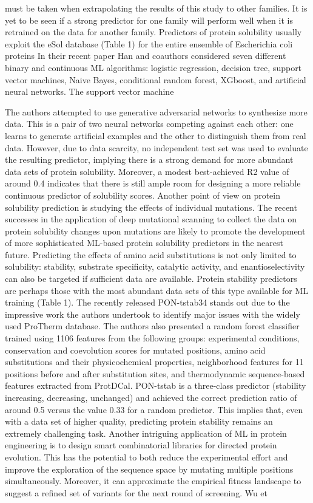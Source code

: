 \documentclass[12pt]{article}
\begin{document}
must be taken when extrapolating the results of this study to other families. It is yet to be seen if a strong predictor for one family will perform well when it is retrained on the data for another family. Predictors of protein solubility usually exploit the eSol database (Table 1) for the entire ensemble of Escherichia coli proteins \cite{67} In their recent paper \cite{35} Han and coauthors considered seven diﬀerent binary and continuous ML algorithms: logistic regression, decision tree, support vector
machines, Naive Bayes, conditional random forest, XGboost, and artiﬁcial neural networks. The support vector machine

The authors attempted to use generative adversarial networks to synthesize more data. This is a pair of two neural networks competing against each other: one learns to generate artiﬁcial examples and the other to distinguish them from real data. However, due to data scarcity, no independent test set was used to evaluate the resulting predictor, implying there is a strong demand for more abundant data sets of protein solubility. Moreover, a modest best-achieved R2 value of around 0.4 indicates that there is still ample room for designing a more reliable continuous predictor of solubility scores. Another point of view on protein solubility prediction is studying the eﬀects of individual mutations. The recent successes in the application of deep mutational scanning to collect the data on protein solubility changes upon mutations\cite{68} are likely to promote the development of more sophisticated ML-based protein solubility predictors in the nearest future. Predicting the eﬀects of amino acid substitutions is not only limited to solubility: stability, substrate speciﬁcity, catalytic activity, and enantioselectivity can also be targeted if suﬃcient data are available. Protein stability predictors are perhaps those with the most abundant data sets of this type available for ML training (Table 1). The recently released PON-tstab34 stands out due to the impressive work the authors undertook to identify major issues with the widely used ProTherm database. The authors also presented a random forest classiﬁer trained using 1106 features from the following groups: experimental conditions, conservation and coevolution scores for mutated positions, amino acid substitutions and their physicochemical properties, neighborhood features for 11 positions before and after substitution sites, and thermodynamic sequence-based features extracted from ProtDCal\cite{69}. PON-tstab is a three-class predictor (stability increasing, decreasing, unchanged) and achieved the correct prediction ratio of around 0.5 versus the value 0.33 for a random predictor. This implies that, even with a data set of higher quality, predicting protein stability remains an extremely challenging task\cite{5}. Another intriguing application of ML in protein engineering is to design smart combinatorial libraries for directed protein evolution\cite{70}. This has the potential to both reduce the experimental eﬀort and improve the exploration of the sequence space by mutating multiple positions simultaneously. Moreover, it can approximate the empirical ﬁtness landscape to suggest a reﬁned set of variants for the next round of screening. Wu et 
\end{document}

